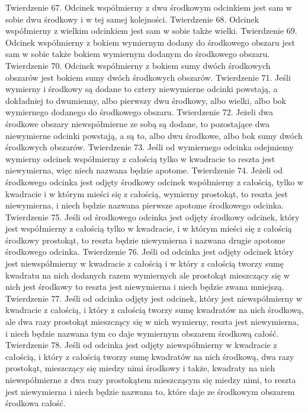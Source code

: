     Twierdzenie 67.
        Odcinek współmierny z dwu środkowym odcinkiem jest sam w sobie dwu środkowy i w tej samej kolejności.
    Twierdzenie 68.
        Odcinek współmierny z wielkim odcinkiem jest sam w sobie także wielki.
    Twierdzenie 69.
        Odcinek współmierny z bokiem wymiernym dodany do środkowego obszaru jest sam w sobie także bokiem wymiernym dodanym do środkowego obszaru.
    Twierdzenie 70.
        Odcinek współmierny z bokiem sumy dwóch środkowych obszarów jest bokiem sumy dwóch środkowych obszarów.
    Twierdzenie 71.
        Jeśli wymierny i środkowy są dodane to cztery niewymierne odcinki powstają, a dokładniej to dwumienny, albo pierwszy dwu środkowy, albo wielki, albo bok wymiernego dodanego do środkowego obszaru.
    Twierdzenie 72.
        Jeżeli dwa środkowe obszary niewspółmierne ze sobą są dodane, to pozostające dwa niewymierne odcinki powstają, a są to, albo dwu środkowe, albo bok sumy dwóch środkowych obszarów.
    Twierdzenie 73.
        Jeśli od wymiernego odcinka odejmiemy wymierny odcinek współmierny z całością tylko w kwadracie to reszta jest niewymierna, więc niech nazwana będzie apotome.
    Twierdzenie 74.
        Jeżeli od środkowego odcinka jest odjęty środkowy odcinek współmierny z całością, tylko w kwadracie i w którym mieści się z całością, wymierny prostokąt, to reszta jest niewymierna, i niech będzie nazwana pierwsze apotome środkowego odcinka.
    Twierdzenie 75.
        Jeśli od środkowego odcinka jest odjęty środkowy odcinek, który jest współmierny z całością tylko w kwadracie, i w którym mieści się z całością środkowy prostokąt, to reszta będzie niewymierna i nazwana drugie apotome środkowego odcinka. 
    Twierdzenie 76.
        Jeśli od odcinka jest odjęty odcinek który jest niewspółmierny w kwadracie z całością i w który z całością tworzy sumę kwadratu na nich dodanych razem wymiernych ale prostokąt mieszczący się w nich jest środkowy to reszta jest niewymierna i niech będzie zwana mniejszą.
    Twierdzenie 77.
        Jeśli od odcinka odjęty jest odcinek, który jest niewspółmierny w kwadracie z całością, i który z całością tworzy sumę kwadratów na nich środkową, ale dwa razy prostokąt mieszczący się w nich wymierny, reszta jest niewymierna, i niech będzie nazwana tym co daje wymiernym obszarem środkową całość.
    Twierdzenie 78.
        Jeśli od odcinka jest odjęty niewspółmierny w kwadracie z całością, i który z całością tworzy sumę kwadratów na nich środkową, dwa razy prostokąt, mieszczący się miedzy nimi środkowy i także, kwadraty na nich niewspółmierne z dwa razy prostokątem mieszczącym się miedzy nimi, to reszta jest niewymierna i niech będzie nazwana to, które daje ze środkowym obszarem środkowa całość.

